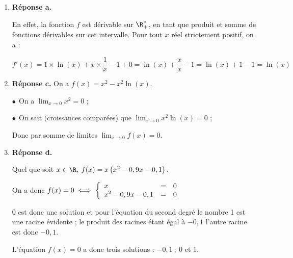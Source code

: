 
\medskip

\begin{enumerate}
\item \textbf{Réponse a.}

En effet, la fonction $f$ est dérivable sur $\R_{+}^{*}$, en tant que produit et somme de fonctions dérivables sur cet intervalle. Pour tout $x$ réel strictement positif, on a :

$f'(x)= 1 \times \ln(x) + x \times \dfrac{1}{x} - 1 + 0 = \ln(x) + \dfrac{x}{x} - 1 = \ln(x) +1-1 = \ln (x)$
\item \textbf{Réponse c.}
On a $f(x) = x^2 - x^2\ln (x)$.

$\bullet~~$On a $\displaystyle\lim_{x \to 0} x^2 = 0$ ;

$\bullet~~$On sait (croissances comparées) que  $\displaystyle\lim_{x \to 0} x^2 \ln (x) = 0$ ;

Donc par somme de limites $\displaystyle\lim_{x \to 0}f(x) = 0$.
%
%
\item \textbf{Réponse d.}

Quel que soit $x \in \R,\: f(x) = x\left(x^2 - 0,9x - 0,1\right)$.

On a donc $f(x) = 0 \iff \left\{\begin{array}{l c l}
x&=&0\\
x^2 - 0,9x - 0,1&=&0
\end{array}\right.$

$0$ est donc une solution et pour l'équation du second degré le nombre 1 est une racine évidente ; le produit des racines étant égal à $-0,1$ l'autre racine est donc $- 0,1$.

L'équation $f(x) = 0$  a donc trois solutions : $-0,1 \:;\ 0$ et 1.


\end{enumerate}
